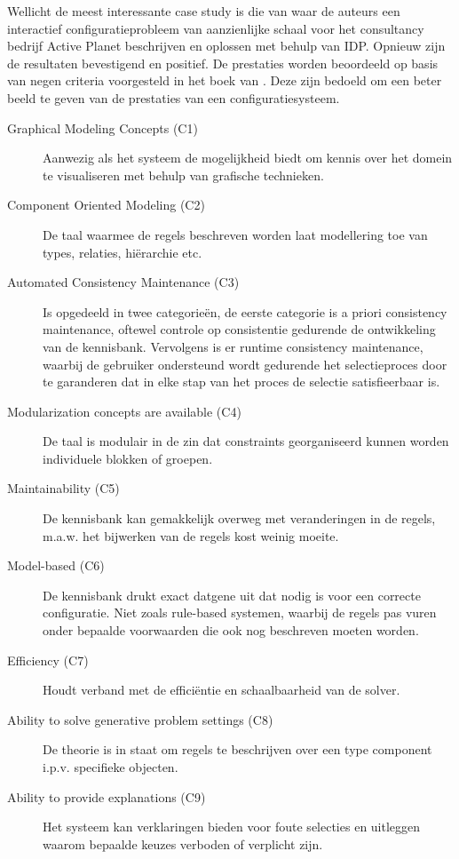 Wellicht de meest interessante case study is die van \citep{van2016kb} waar de auteurs een interactief configuratieprobleem van aanzienlijke schaal voor het consultancy bedrijf Active Planet beschrijven en oplossen met behulp van IDP. Opnieuw zijn de resultaten bevestigend en positief. De prestaties worden beoordeeld op basis van negen criteria voorgesteld in het boek van \citep{felfernig2014knowledge}. Deze zijn bedoeld om een beter beeld te geven van de prestaties van een configuratiesysteem. 
\begin{description}
\item[Graphical Modeling Concepts (C1)] Aanwezig als het systeem de mogelijkheid biedt om kennis over het domein te visualiseren met behulp van grafische technieken.
\item[Component Oriented Modeling (C2)] De taal waarmee de regels beschreven worden laat modellering toe van types, relaties, hi\"{e}rarchie etc.
\item[Automated Consistency Maintenance (C3)] Is opgedeeld in twee categorie\"{e}n, de eerste categorie is a priori consistency maintenance, oftewel controle op consistentie gedurende de ontwikkeling van de kennisbank. Vervolgens is er runtime consistency maintenance, waarbij de gebruiker ondersteund wordt gedurende het selectieproces door te garanderen dat in elke stap van het proces de selectie satisfieerbaar is.
\item[Modularization concepts are available (C4)] De taal is modulair in de zin dat constraints georganiseerd kunnen worden individuele blokken of groepen.
\item[Maintainability (C5)] De kennisbank kan gemakkelijk overweg met veranderingen in de regels, m.a.w. het bijwerken van de regels kost weinig moeite. 
\item[Model-based (C6)] De kennisbank drukt exact datgene uit dat nodig is voor een correcte configuratie. Niet zoals rule-based systemen, waarbij de regels pas vuren onder bepaalde voorwaarden die ook nog beschreven moeten worden.
\item[Efficiency (C7)] Houdt verband met de effici\"{e}ntie en schaalbaarheid van de solver.
\item[Ability to solve generative problem settings (C8)] De theorie is in staat om regels te beschrijven over een type component i.p.v. specifieke objecten.
\item[Ability to provide explanations (C9)] Het systeem kan verklaringen bieden voor foute selecties en uitleggen waarom bepaalde keuzes verboden of verplicht zijn.
\end{description}
